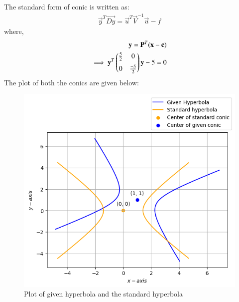 \documentclass[journal,12pt,twocolumn]{IEEEtran}
\begin{document}
The standard form of conic is written as:
\begin{align}
  \vec{y}^T\vec{Dy} = \vec{u}^T\vec{V}^{-1}\vec{u} - f
\end{align}
where,
\begin{align}
  \mathbf{y} = \mathbf{P}^T(\mathbf{x-c}) \\
  \implies \mathbf{y}^T \begin{pmatrix}\frac{5}{2} & 0 \\[0.2cm] 0 & \frac{-5}{2}\end{pmatrix} \mathbf{y} -5 = 0
\end{align}
The plot of both the conics are given below:
\begin{figure}[h!]
\centering
    \includegraphics[width=\columnwidth]{hyperbola.png}
    \caption{Plot of given hyperbola and the standard hyperbola}
    \label{fig:1}
\end{figure}
\end{document}
